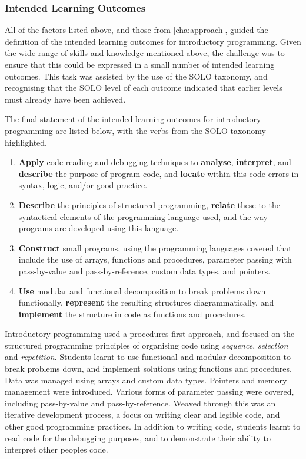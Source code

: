 

\subsubsection{Intended Learning Outcomes} %
\label{ssub:intro_intended_learning_outcomes}

All of the factors listed above, and those from \cref{cha:approach}, guided the definition of the intended learning outcomes for introductory programming. Given the wide range of skills and knowledge mentioned above, the challenge was to ensure that this could be expressed in a small number of intended learning outcomes. This task was assisted by the use of the SOLO taxonomy, and recognising that the SOLO level of each outcome indicated that earlier levels must already have been achieved.

The final statement of the intended learning outcomes for introductory programming are listed below, with the verbs from the SOLO taxonomy highlighted.
\begin{enumerate}
	\item \textbf{Apply} code reading and debugging techniques to \textbf{analyse}, \textbf{interpret}, and \textbf{describe} the purpose of program code, and \textbf{locate} within this code errors in syntax, logic, and/or good practice.
	\item \textbf{Describe} the principles of structured programming, \textbf{relate} these to the syntactical elements of the programming language used, and the way programs are developed using this language.
	\item \textbf{Construct} small programs, using the programming languages covered that include the use of arrays, functions and procedures, parameter passing with pass-by-value and pass-by-reference, custom data types, and pointers.
	\item \textbf{Use} modular and functional decomposition to break problems down functionally, \textbf{represent} the resulting structures diagrammatically, and \textbf{implement} the structure in code as functions and procedures.
\end{enumerate}

Introductory programming used a procedures-first approach, and focused on the structured programming principles of organising code using \emph{sequence}, \emph{selection} and \emph{repetition}. Students learnt to use functional and modular decomposition to break problems down, and implement solutions using functions and procedures. Data was managed using arrays and custom data types. Pointers and memory management were introduced. Various forms of parameter passing were covered, including pass-by-value and pass-by-reference. Weaved through this was an iterative development process, a focus on writing clear and legible code, and other good programming practices. In addition to writing code, students learnt to read code for the debugging purposes, and to demonstrate their ability to interpret other peoples code.

